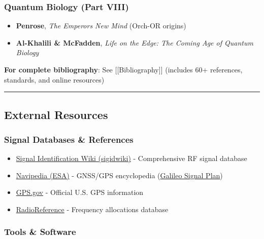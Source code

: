 \subsubsection{Quantum Biology (Part
VIII)}\label{quantum-biology-part-viii}

\begin{itemize}
\tightlist
\item
  \textbf{Penrose}, \emph{The Emperor\textquotesingle s New Mind}
  (Orch-OR origins)
\item
  \textbf{Al-Khalili \& McFadden}, \emph{Life on the Edge: The Coming
  Age of Quantum Biology}
\end{itemize}

\textbf{ For complete bibliography}: See {[}{[}Bibliography{]}{]}
(includes 60+ references, standards, and online resources)

\begin{center}\rule{0.5\linewidth}{0.5pt}\end{center}

\subsection{\texorpdfstring{ External
Resources}{ External Resources}}\label{external-resources}

\subsubsection{Signal Databases \&
References}\label{signal-databases-references}

\begin{itemize}
\tightlist
\item
  \href{https://www.sigidwiki.com/wiki/Signal_Identification_Guide}{Signal
  Identification Wiki (sigidwiki)} - Comprehensive RF signal database
\item
  \href{https://gssc.esa.int/navipedia/}{Navipedia (ESA)} - GNSS/GPS
  encyclopedia
  (\href{https://gssc.esa.int/navipedia/index.php?title=GALILEO_Signal_Plan}{Galileo
  Signal Plan})
\item
  \href{https://www.gps.gov/}{GPS.gov} - Official U.S. GPS information
\item
  \href{https://www.radioreference.com/}{RadioReference} - Frequency
  allocations database
\end{itemize}

\subsubsection{Tools \& Software}\label{tools-software}

